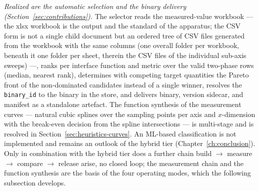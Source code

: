 \begin{nurlang}
\emph{Realized are the automatic selection and the binary delivery (Section~\ref{sec:contributions}).}
The selector reads the measured-value workbook ---
the xlsx workbook is the output and the standard of the apparatus; the CSV form is not a single
child document but an ordered tree of CSV files generated from the workbook with the same columns
(one overall folder per workbook, beneath it one folder per sheet, therein the CSV files of the individual
sub-axis sweeps) ---, ranks per
interface function and metric over the valid two-phase rows (median, nearest rank), determines with
competing target quantities the Pareto front of the non-dominated candidates instead of a single winner,
resolves the \texttt{binary\_id} to the binary in the store, and delivers binary, version sidecar, and manifest
as a standalone artefact.
The function synthesis of the measurement curves --- natural cubic splines over the sampling points per axis
and $x$-dimension with the break-even decision from the spline intersections --- is multi-stage and is
resolved in Section~\ref{sec:heuristics-curves}. An ML-based classification is not implemented and remains
an outlook of the hybrid tier (Chapter~\ref{ch:conclusion}). Only in combination with the hybrid tier does
a further chain build $\to$ measure $\to$ compare $\to$ release arise, no closed loop; the measurement chain
and the function synthesis are the basis of the four operating modes, which the following subsection
develops.
\end{nurlang}
